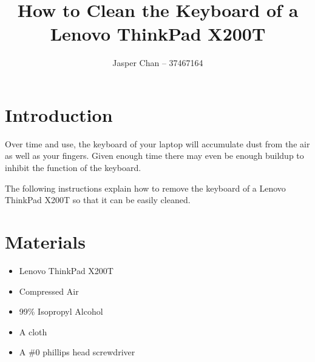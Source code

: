 \documentclass{article}
\title{How to Clean the Keyboard of a Lenovo ThinkPad X200T}
\author{Jasper Chan -- 37467164}
\begin{document}
\maketitle

\section*{Introduction}
Over time and use, the keyboard of your laptop will accumulate dust from the air as well as your fingers.
Given enough time there may even be enough buildup to inhibit the function of the keyboard.

\vspace{12pt} %

\noindent The following instructions explain how to remove the keyboard of a Lenovo ThinkPad X200T so that it can be easily cleaned.

\section*{Materials}
\begin{itemize}
	\item Lenovo ThinkPad X200T
	\item Compressed Air
	\item 99\% Isopropyl Alcohol
	\item A cloth
	\item A \#0 phillips head screwdriver
\end{itemize}

\clearpage
\end{document}
